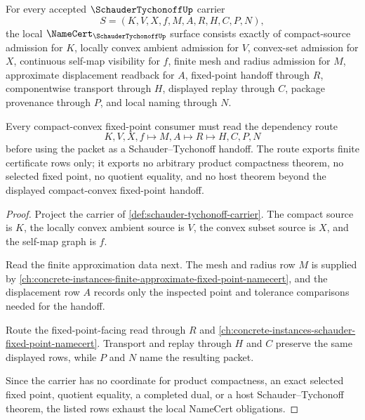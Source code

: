 \begin{theorem}
\label{thm:schauder-tychonoff-namecert-obligations}
For every accepted $\SchauderTychonoffUp$ carrier
$$
S=(K,V,X,f,M,A,R,H,C,P,N),
$$
the local $\NameCert_{\SchauderTychonoffUp}$ surface consists exactly of compact-source admission for $K$, locally convex ambient admission for $V$, convex-set admission for $X$, continuous self-map visibility for $f$, finite mesh and radius admission for $M$, approximate displacement readback for $A$, fixed-point handoff through $R$, componentwise transport through $H$, displayed replay through $C$, package provenance through $P$, and local naming through $N$.

Every compact-convex fixed-point consumer must read the dependency route
$$
K,V,X,f \longmapsto M,A \longmapsto R \longmapsto H,C,P,N
$$
before using the packet as a Schauder--Tychonoff handoff. The route exports finite certificate rows only; it exports no arbitrary product compactness theorem, no selected fixed point, no quotient equality, and no host theorem beyond the displayed compact-convex fixed-point handoff.
\end{theorem}
\begin{proof}
Project the carrier of \autoref{def:schauder-tychonoff-carrier}. The compact source is $K$, the locally convex ambient source is $V$, the convex subset source is $X$, and the self-map graph is $f$.

Read the finite approximation data next. The mesh and radius row $M$ is supplied by \autoref{ch:concrete-instances-finite-approximate-fixed-point-namecert}, and the displacement row $A$ records only the inspected point and tolerance comparisons needed for the handoff.

Route the fixed-point-facing read through $R$ and \autoref{ch:concrete-instances-schauder-fixed-point-namecert}. Transport and replay through $H$ and $C$ preserve the same displayed rows, while $P$ and $N$ name the resulting packet.

Since the carrier has no coordinate for product compactness, an exact selected fixed point, quotient equality, a completed dual, or a host Schauder--Tychonoff theorem, the listed rows exhaust the local NameCert obligations.
\end{proof}


